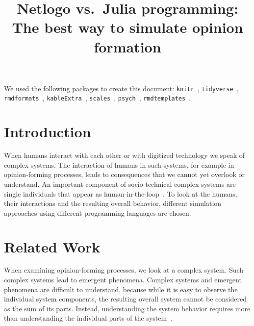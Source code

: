 \documentclass[runningheads]{llncs}
\begin{document}
%
\title{Netlogo vs.~Julia programming: The best way to simulate opinion
formation}
%
%


%
\maketitle              %
%
\begin{abstract}

\end{abstract}
%
%
%
We used the following packages to create this document:
\texttt{knitr}~\autocite{R-knitr},
\texttt{tidyverse}~\autocite{R-tidyverse},
\texttt{rmdformats}~\autocite{R-rmdformats},
\texttt{kableExtra}~\autocite{R-kableExtra},
\texttt{scales}~\autocite{R-scales}, \texttt{psych}~\autocite{R-psych},
\texttt{rmdtemplates}~\autocite{R-rmdtemplates}.

\hypertarget{introduction}{%
\section{Introduction}\label{introduction}}

When humans interact with each other or with digitized technology we
speak of complex systems. The interaction of humans in such systems, for
example in opinion-forming processes, leads to consequences that we
cannot yet overlook or understand. An important component of
socio-technical complex systems are single individuals that appear as
human-in-the-loop~\autocite{Valdez2018human}. To look at the humans,
their interactions and the resulting overall behavior, different
simulation approaches using different programming languages are chosen.

\hypertarget{related-work}{%
\section{Related Work}\label{related-work}}

When examining opinion-forming processes, we look at a complex system.
Such complex systems lead to emergent phenomena. Complex systems and
emergent phenomena are difficult to understand, because while it is easy
to observe the individual system components, the resulting overall
system cannot be considered as the sum of its parts. Instead,
understanding the system behavior requires more than understanding the
individual parts of the system~\autocite{Valdez2018human}.
\end{document}
